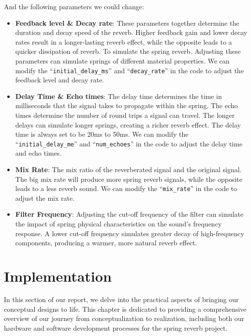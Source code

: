 \documentclass[12pt]{article}
\begin{document}
And the following parameters we could change:

\begin{itemize}
	\item \textbf{Feedback level \& Decay rate}:  These parameters together determine the duration and decay speed of the reverb. Higher feedback gain and lower decay rates result in a longer-lasting reverb effect, while the opposite leads to a quicker dissipation of reverb. To simulate the spring reverb. Adjusting these parameters can simulate springs of different material properties. We can modify the ``\texttt{initial\_delay\_ms}'' and ``\texttt{decay\_rate}'' in the code to adjust the feedback level and decay rate.
	
	\item \textbf{Delay Time \& Echo times}: The delay time determines the time in milliseconds that the signal takes to propagate within the spring. The echo times determine the number of round trips a signal can travel. The longer delays can simulate longer springs, creating a richer reverb effect. The delay time is always set to be 20ms to 50ms. We can modify the ``\texttt{initial\_delay\_me}'' and ``\texttt{num\_echoes}'' in the code to adjust the delay time and echo times.
	
	\item \textbf{Mix Rate}: The mix ratio of the reverberated signal and the original signal. The big mix rate will produce more spring reverb signals, while the opposite leads to a less reverb sound. We can modify the ``\texttt{mix\_rate}'' in the code to adjust the mix rate.

	\item \textbf{Filter Frequency}: Adjusting the cut-off frequency of the filter can simulate the impact of spring physical characteristics on the sound's frequency response. A lower cut-off frequency simulates greater decay of high-frequency components, producing a warmer, more natural reverb effect.
	
\end{itemize}

\newpage
\section{Implementation}

In this section of our report, we delve into the practical aspects of bringing our conceptual designs to life. This chapter is dedicated to providing a comprehensive overview of our journey from conceptualization to realization, including both our hardware and software development processes for the spring reverb project.
\end{document}
